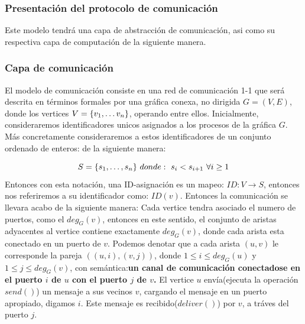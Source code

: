 \documentclass[10pt]{report}
\begin{document}
    \subsubsection{Presentación del protocolo de comunicación}
    Este modelo tendrá una capa de abstracción de comunicación, asi como su respectiva capa de
    computación de la siguiente manera.
    \subsubsection{Capa de comunicación}
    El modelo de comunicación consiste en una red de comunicación 1-1 que será descrita en términos formales por
    una gráfica conexa, no dirigida $G=(V,E)$, donde los vertices $V=\{ v_{1},\mathellipsis v_{n} \}$,\space
    operando entre ellos.
    Inicialmente, consideraremos identificadores unicos asignados a los procesos de la gráfica $G$.\space
    Más concretamente consideraremos a estos identificadores de un conjunto ordenado de enteros:
    de la siguiente manera:

    \begin{equation}
        S = \{ s_{1},\mathellipsis,s_{n}\} \
        donde:\ s_{i} < s_{i+1} \ \forall i\geq 1\label{eq:equation}
    \end{equation}
    Entonces con esta notación, una ID-asignación es un mapeo:
    $ID:V\rightarrow S$, entonces nos referiremos a su identificador como:
    $ID(v)$. \newline
    Entonces la comunicación se llevara acabo de la siguiente manera: \newline
    Cada vertice tendra asociado el numero de puertos, como el $deg_{G}(v)$,
    entonces en este sentido, el conjunto de aristas adyacentes al vertice
    contiene exactamente $deg_{G}(v)$, donde cada arista esta conectado en un puerto de $v$.
    \newline
    Podemos denotar que a cada arista $(u,v)$ le corresponde la pareja
    $((u,i),(v,j))$, donde $1\leq i \leq deg_{G}(u) $ y $1\leq j \leq deg_{G}(v)$,
    con semántica:\newline \textbf{un canal de comunicación conectadose en el puerto $i$  de $u$ con el puerto $j$ de
    $v$.}\newline
    El vertice $u$ envía(ejecuta la operación $send()$) un mensaje a sus vecinos $v$, cargando el mensaje en un puerto apropiado, digamos $i$.
    Este mensaje es recibido($deliver()$) por $v$, a tráves del puerto $j$. \newline
\end{document}
